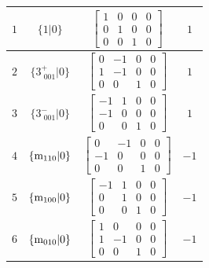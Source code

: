\documentclass[fleqn,8pt]{jsarticle}
\begin{document}
\begin{longtable}{cccc}
$ 1 $ & $ \{1|0\} $ & $ \begin{bmatrix} 1 & 0 & 0 & 0 \\ 0 & 1 & 0 & 0 \\ 0 & 0 & 1 & 0 \end{bmatrix} $ & $ 1 $ \\ \hline
$ 2 $ & $ \{3^{+}_{\,\,001}|0\} $ & $ \begin{bmatrix} 0 & -1 & 0 & 0 \\ 1 & -1 & 0 & 0 \\ 0 & 0 & 1 & 0 \end{bmatrix} $ & $ 1 $ \\ \hline
$ 3 $ & $ \{3^{-}_{\,\,001}|0\} $ & $ \begin{bmatrix} -1 & 1 & 0 & 0 \\ -1 & 0 & 0 & 0 \\ 0 & 0 & 1 & 0 \end{bmatrix} $ & $ 1 $ \\ \hline
$ 4 $ & $ \{{\rm m}_{110}|0\} $ & $ \begin{bmatrix} 0 & -1 & 0 & 0 \\ -1 & 0 & 0 & 0 \\ 0 & 0 & 1 & 0 \end{bmatrix} $ & $ -1 $ \\ \hline
$ 5 $ & $ \{{\rm m}_{100}|0\} $ & $ \begin{bmatrix} -1 & 1 & 0 & 0 \\ 0 & 1 & 0 & 0 \\ 0 & 0 & 1 & 0 \end{bmatrix} $ & $ -1 $ \\ \hline
$ 6 $ & $ \{{\rm m}_{010}|0\} $ & $ \begin{bmatrix} 1 & 0 & 0 & 0 \\ 1 & -1 & 0 & 0 \\ 0 & 0 & 1 & 0 \end{bmatrix} $ & $ -1 $ \\
\end{longtable}
\end{document}
